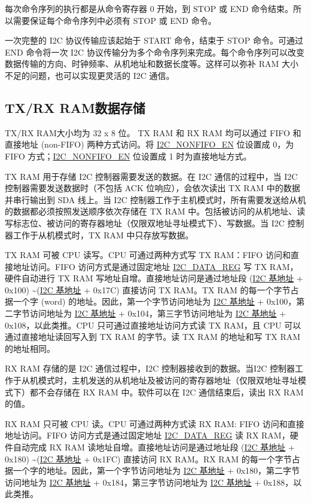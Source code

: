 \documentclass[main\_\_CN.tex]{subfiles}
\begin{document}
每次命令序列的执行都是从命令寄存器 0 开始，到 STOP 或 END 命令结束。所以需要保证每个命令序列中必须有 STOP 或 END 命令。

一次完整的 I2C 协议传输应该起始于 START 命令，结束于 STOP 命令。可通过 END 命令将一次 I2C 协议传输分为多个命令序列来完成。每个命令序列可以改变数据传输的方向、时钟频率、从机地址和数据长度等。这样可以弥补 RAM 大小不足的问题，也可以实现更灵活的 I2C 通信。 

\subsection{TX/RX RAM数据存储}\label{subsubsec:i2c-txrx}
TX/RX RAM大小均为 32 x 8 位。 TX RAM 和 RX RAM 均可以通过 FIFO 和直接地址 (non-FIFO) 两种方式访问。将 \hyperref[fielddesc:I2CNONFIFOEN]{I2C\_NONFIFO\_EN} 位设置成 0，为 FIFO 方式；\hyperref[fielddesc:I2CNONFIFOEN]{I2C\_NONFIFO\_EN} 位设置成 1 时为直接地址方式。

TX RAM 用于存储 I2C 控制器需要发送的数据。在 I2C 通信的过程中，当 I2C 控制器需要发送数据时（不包括 ACK 位响应），会依次读出 TX RAM 中的数据并串行输出到 SDA 线上。当 I2C 控制器工作于主机模式时，所有需要发送给从机的数据都必须按照发送顺序依次存储在 TX RAM 中。包括被访问的从机地址、读写标志位、被访问的寄存器地址（仅限双地址寻址模式下）、写数据。当 I2C 控制器工作于从机模式时，TX RAM 中只存放写数据。

TX RAM 可被 CPU 读写。CPU 可通过两种方式写 TX RAM：FIFO 访问和直接地址访问。FIFO 访问方式是通过固定地址 \hyperref[regdesc:I2CDATAREG]{I2C\_DATA\_REG} 写 TX RAM，硬件自动进行 TX RAM 写地址自增。直接地址访问是通过地址段 (\hyperref[tab:sysmem-base-address]{I2C 基地址} + 0x100) \textasciitilde (\hyperref[tab:sysmem-base-address]{I2C 基地址} + 0x17C) 直接访问 TX RAM。TX RAM 的每一个字节占据一个字 (word) 的地址。因此，第一个字节访问地址为 \hyperref[tab:sysmem-base-address]{I2C 基地址} + 0x100，第二字节访问地址为 \hyperref[tab:sysmem-base-address]{I2C 基地址} + 0x104，第三字节访问地址为 \hyperref[tab:sysmem-base-address]{I2C 基地址} + 0x108，以此类推。CPU 只可通过直接地址访问方式读 TX RAM，且 CPU 可以通过直接地址读回写入到 TX RAM 的字节。读 TX RAM 的地址和写 TX RAM 的地址相同。

RX RAM 存储的是 I2C 通信过程中，I2C 控制器接收到的数据。当I2C 控制器工作于从机模式时，主机发送的从机地址及被访问的寄存器地址（仅限双地址寻址模式下）都不会存储在 RX RAM 中。软件可以在 I2C 通信结束后，读出 RX RAM 的值。 


RX RAM 只可被 CPU 读。CPU 可通过两种方式读 RX RAM: FIFO 访问和直接地址访问。FIFO 访问方式是通过固定地址 \hyperref[regdesc:I2CDATAREG]{I2C\_DATA\_REG} 读 RX RAM，硬件自动完成 RX RAM 读地址自增。直接地址访问是通过地址段 (\hyperref[tab:sysmem-base-address]{I2C 基地址} + 0x180) \textasciitilde (\hyperref[tab:sysmem-base-address]{I2C 基地址} + 0x1FC) 直接访问 RX RAM。RX RAM 的每一个字节占据一个字的地址。因此，第一个字节访问地址为 \hyperref[tab:sysmem-base-address]{I2C 基地址} + 0x180，第二字节访问地址为 \hyperref[tab:sysmem-base-address]{I2C 基地址} + 0x184，第三字节访问地址为 \hyperref[tab:sysmem-base-address]{I2C 基地址} + 0x188，以此类推。
\end{document}
